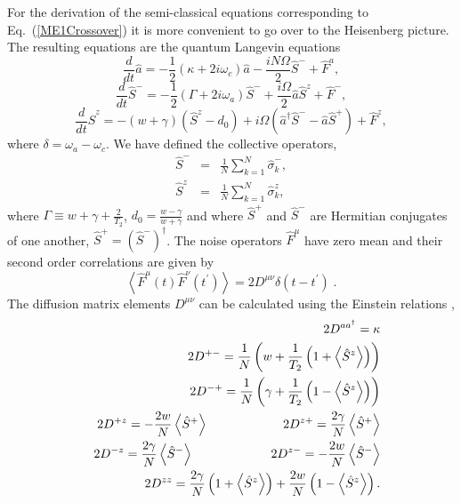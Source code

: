 \documentclass[aps,
twocolumn,
showpacs,
superscriptaddress,groupedaddress]{revtex4}
\begin{document}
For the derivation of the semi-classical equations corresponding to 
Eq.~(\ref{ME1Crossover}) it is more convenient to go over to the
Heisenberg picture.  The resulting equations are the quantum Langevin
equations
\begin{equation}
\frac{d}{dt} \hat{a}= -\frac{1}{2} (\kappa +2i\omega_c) \hat{a}
-\frac{i N \Omega}{2} \hat{S}^{-}
+\hat{F}^{a},
\label{La}
\end{equation}
\begin{equation}
\frac{d}{dt} \hat{S}^{-} =
-\frac{1}{2} \left(\Gamma +2 i \omega_a \right)  \hat{S}^{-}
+\frac{i \Omega}{2} \hat{a} \hat{S}^{z}
+\hat{F}^{-},
\label{Lsm}
\end{equation}
\begin{equation}
\frac{d}{dt} \hat{S}^{z} =
-(w+\gamma)\left( \hat{S}^{z} - d_0\right)
+i\Omega \left( \hat{a}^{\dagger}\hat{S}^{-} -
\hat{a}\hat{S}^{+} \right)
+\hat{F}^{z},
\label{Lsz}
\end{equation}
where $\delta=\omega_{a}-\omega_{c}$. We have defined the collective
operators,
\begin{eqnarray}
\hat{S}^{-}&=&\frac{1}{N}\sum_{k=1}^N \hat{\sigma}_k^{-},
\nonumber
\\
\hat{S}^{z}&=&\frac{1}{N}\sum_{k=1}^N \hat{\sigma}_k^{z},
\nonumber
\end{eqnarray}
where $\Gamma \equiv w+\gamma+\frac{2}{T_2}$, $d_0 =
\frac{w-\gamma}{w+\gamma}$ and where $\hat{S}^{+}$ and $\hat{S}^{-}$ are
Hermitian conjugates of one another, $\hat{S}^{+} =
(\hat{S}^{-})^{\dagger}$. The noise operators $\hat F^\mu$ have zero
mean and their second order correlations are given by
\begin{equation}
\left< \hat{F}^{\mu}(t) \hat{F}^{\nu}(t^{\prime})\right> =
2 D^{\mu \nu} \delta(t-t^{\prime})\;.
\end{equation}
The diffusion matrix elements $D^{\mu \nu} $ can be calculated using the
Einstein relations \cite{meystre2007elements},
\begin{eqnarray}
&& 2D^{a a^{\dagger}}= \kappa \nonumber \\
&& 2D^{+-}= \frac{1}{N}
\left(
  w + \frac{1}{T_2} \left(1 + \left< \hat{S}^{z} \right> \right)
\right) \nonumber \\
&& 2D^{-+}= \frac{1}{N}
\left(
  \gamma + \frac{1}{T_2} \left(1- \left< \hat{S}^{z} \right> \right)
\right) \nonumber \\
&& 2D^{+z}= -\frac{2w}{N} \left< \hat{S}^{+} \right>
\hspace{0.83in} 2D^{z+}= \frac{2\gamma}{N} \left< \hat{S}^{+} \right>
\nonumber \\
&& 2D^{-z}= \frac{2\gamma}{N} \left< \hat{S}^{-} \right>
\hspace{0.86in} 2D^{z-}= -\frac{2w}{N} \left< \hat{S}^{-} \right>
\nonumber \\
&& 2D^{zz}= \frac{2\gamma}{N}
\left(1+ \left< \hat{S}^{z} \right> \right) +
\frac{2w}{N}\left(1- \left< \hat{S}^{z} \right> \right).
\label{OpNoise1}
\end{eqnarray}
\end{document}
